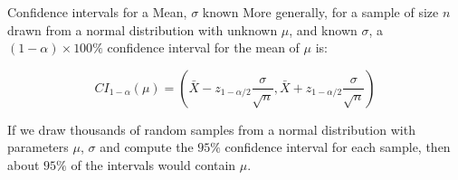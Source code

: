 \documentclass[
  ignorenonframetext,
]{beamer}
\begin{document}
\begin{frame}{Confidence intervals for a Mean, \(\sigma\) known}
\label{confidence-intervals-for-a-mean-sigma-known-4}
More generally, for a sample of size \(n\) drawn from a normal
distribution with unknown \(\mu\), and known \(\sigma\), a
\((1-\alpha)\times 100\%\) confidence interval for the mean of \(\mu\)
is:

\[CI_{1-\alpha}(\mu)=\left(\bar{X}-z_{1-\alpha/2}\frac{\sigma}{\sqrt{n}},\bar{X}+z_{1-\alpha/2}\frac{\sigma}{\sqrt{n}}\right)\]

If we draw thousands of random samples from a normal distribution with
parameters \(\mu\), \(\sigma\) and compute the \(95\%\) confidence
interval for each sample, then about \(95\%\) of the intervals would
contain \(\mu\).
\end{frame}
\end{document}
